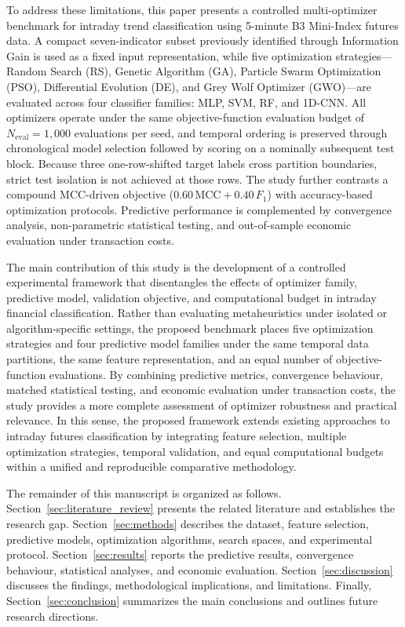 To address these limitations, this paper presents a controlled multi-optimizer benchmark for intraday trend classification using 5-minute B3 Mini-Index futures data. A compact seven-indicator subset previously identified through Information Gain is used as a fixed input representation, while five optimization strategies---Random Search (RS), Genetic Algorithm (GA), Particle Swarm Optimization (PSO), Differential Evolution (DE), and Grey Wolf Optimizer (GWO)---are evaluated across four classifier families: MLP, SVM, RF, and 1D-CNN. All optimizers operate under the same objective-function evaluation budget of $N_{\mathrm{eval}} = 1{,}000$ evaluations per seed, and temporal ordering is preserved through chronological model selection followed by scoring on a nominally subsequent test block. Because three one-row-shifted target labels cross partition boundaries, strict test isolation is not achieved at those rows. The study further contrasts a compound MCC-driven objective ($0.60\,\mathrm{MCC} + 0.40\,F_1$) with accuracy-based optimization protocols. Predictive performance is complemented by convergence analysis, non-parametric statistical testing, and out-of-sample economic evaluation under transaction costs.

The main contribution of this study is the development of a controlled experimental framework that disentangles the effects of optimizer family, predictive model, validation objective, and computational budget in intraday financial classification. Rather than evaluating metaheuristics under isolated or algorithm-specific settings, the proposed benchmark places five optimization strategies and four predictive model families under the same temporal data partitions, the same feature representation, and an equal number of objective-function evaluations. By combining predictive metrics, convergence behaviour, matched statistical testing, and economic evaluation under transaction costs, the study provides a more complete assessment of optimizer robustness and practical relevance. In this sense, the proposed framework extends existing approaches to intraday futures classification by integrating feature selection, multiple optimization strategies, temporal validation, and equal computational budgets within a unified and reproducible comparative methodology.

The remainder of this manuscript is organized as follows. Section~\ref{sec:literature_review} presents the related literature and establishes the research gap. Section~\ref{sec:methods} describes the dataset, feature selection, predictive models, optimization algorithms, search spaces, and experimental protocol. Section~\ref{sec:results} reports the predictive results, convergence behaviour, statistical analyses, and economic evaluation. Section~\ref{sec:discussion} discusses the findings, methodological implications, and limitations. Finally, Section~\ref{sec:conclusion} summarizes the main conclusions and outlines future research directions.